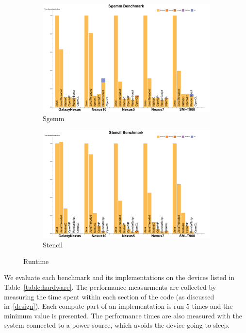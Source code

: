 \begin{figure}[ht]
  \begin{subfigure}[b]{0.5\textwidth}
      \centering
      \includegraphics[width=\textwidth]{data/Sgemm_time.pdf}
      \caption{Sgemm}\label{fig:Sgemm}
  \end{subfigure}
  \begin{subfigure}[b]{0.5\textwidth}
      \centering
      \includegraphics[width=\textwidth]{data/Stencil_time.pdf}
      \caption{Stencil}
      \label{fig:Stencil}
  \end{subfigure}

  \caption{Runtime}
\end{figure}

We evaluate each benchmark and its implementations on the devices listed
  in Table~\ref{table:hardware}.
The performance measurments are collected by measuring the time
  spent within each section of the code (as discussed in~\ref{design}).
Each compute part of an implementation is run $5$ %
  times and the minimum value is presented.
The performance times are also measured with the system connected to a
  power source, which avoids the device going to sleep.

